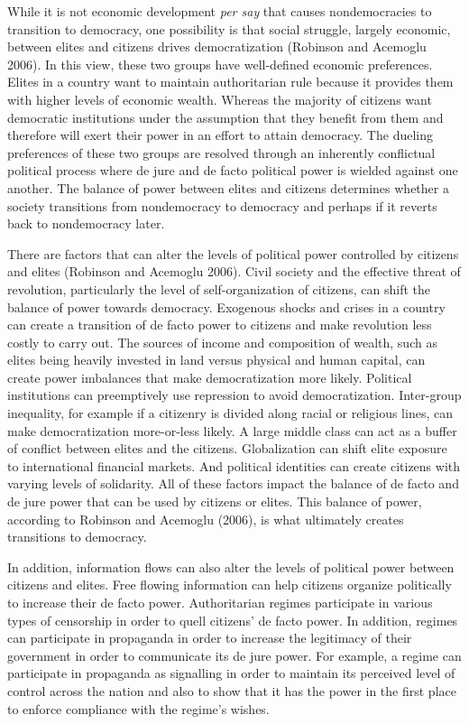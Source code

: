 \documentclass[12pt,]{article}
\begin{document}
While it is not economic development \emph{per say} that causes
nondemocracies to transition to democracy, one possibility is that
social struggle, largely economic, between elites and citizens drives
democratization (Robinson and Acemoglu 2006). In this view, these two
groups have well-defined economic preferences. Elites in a country want
to maintain authoritarian rule because it provides them with higher
levels of economic wealth. Whereas the majority of citizens want
democratic institutions under the assumption that they benefit from them
and therefore will exert their power in an effort to attain democracy.
The dueling preferences of these two groups are resolved through an
inherently conflictual political process where de jure and de facto
political power is wielded against one another. The balance of power
between elites and citizens determines whether a society transitions
from nondemocracy to democracy and perhaps if it reverts back to
nondemocracy later.

There are factors that can alter the levels of political power
controlled by citizens and elites (Robinson and Acemoglu 2006). Civil
society and the effective threat of revolution, particularly the level
of self-organization of citizens, can shift the balance of power towards
democracy. Exogenous shocks and crises in a country can create a
transition of de facto power to citizens and make revolution less costly
to carry out. The sources of income and composition of wealth, such as
elites being heavily invested in land versus physical and human capital,
can create power imbalances that make democratization more likely.
Political institutions can preemptively use repression to avoid
democratization. Inter-group inequality, for example if a citizenry is
divided along racial or religious lines, can make democratization
more-or-less likely. A large middle class can act as a buffer of
conflict between elites and the citizens. Globalization can shift elite
exposure to international financial markets. And political identities
can create citizens with varying levels of solidarity. All of these
factors impact the balance of de facto and de jure power that can be
used by citizens or elites. This balance of power, according to Robinson
and Acemoglu (2006), is what ultimately creates transitions to
democracy.

In addition, information flows can also alter the levels of political
power between citizens and elites. Free flowing information can help
citizens organize politically to increase their de facto power.
Authoritarian regimes participate in various types of censorship in
order to quell citizens' de facto power. In addition, regimes can
participate in propaganda in order to increase the legitimacy of their
government in order to communicate its de jure power. For example, a
regime can participate in propaganda as signalling in order to maintain
its perceived level of control across the nation and also to show that
it has the power in the first place to enforce compliance with the
regime's wishes.
\end{document}
